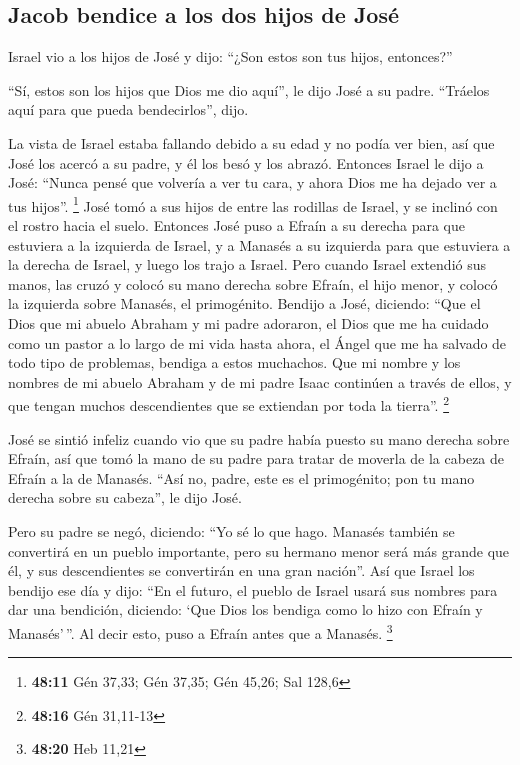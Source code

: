 \hypertarget{jacob-bendice-a-los-dos-hijos-de-josuxe9}{%
\subsection{Jacob bendice a los dos hijos de
José}\label{jacob-bendice-a-los-dos-hijos-de-josuxe9}}

 Israel vio a los hijos de José y dijo: ``¿Son estos son
tus hijos, entonces?''

 ``Sí, estos son los hijos que Dios me dio aquí'', le dijo
José a su padre. ``Tráelos aquí para que pueda bendecirlos'', dijo.

 La vista de Israel estaba fallando debido a su edad y no
podía ver bien, así que José los acercó a su padre, y él los besó y los
abrazó.  Entonces Israel le dijo a José: ``Nunca pensé
que volvería a ver tu cara, y ahora Dios me ha dejado ver a tus hijos''.
\footnote{\textbf{48:11} Gén 37,33; Gén 37,35; Gén 45,26; Sal 128,6}
 José tomó a sus hijos de entre las rodillas de Israel, y
se inclinó con el rostro hacia el suelo.  Entonces José
puso a Efraín a su derecha para que estuviera a la izquierda de Israel,
y a Manasés a su izquierda para que estuviera a la derecha de Israel, y
luego los trajo a Israel.  Pero cuando Israel extendió
sus manos, las cruzó y colocó su mano derecha sobre Efraín, el hijo
menor, y colocó la izquierda sobre Manasés, el primogénito.
 Bendijo a José, diciendo: ``Que el Dios que mi abuelo
Abraham y mi padre adoraron, el Dios que me ha cuidado como un pastor a
lo largo de mi vida hasta ahora,  el Ángel que me ha
salvado de todo tipo de problemas, bendiga a estos muchachos. Que mi
nombre y los nombres de mi abuelo Abraham y de mi padre Isaac continúen
a través de ellos, y que tengan muchos descendientes que se extiendan
por toda la tierra''. \footnote{\textbf{48:16} Gén 31,11-13}

 José se sintió infeliz cuando vio que su padre había
puesto su mano derecha sobre Efraín, así que tomó la mano de su padre
para tratar de moverla de la cabeza de Efraín a la de Manasés.
 ``Así no, padre, este es el primogénito; pon tu mano
derecha sobre su cabeza'', le dijo José.

 Pero su padre se negó, diciendo: ``Yo sé lo que hago.
Manasés también se convertirá en un pueblo importante, pero su hermano
menor será más grande que él, y sus descendientes se convertirán en una
gran nación''.  Así que Israel los bendijo ese día y
dijo: ``En el futuro, el pueblo de Israel usará sus nombres para dar una
bendición, diciendo: `Que Dios los bendiga como lo hizo con Efraín y
Manasés'\,''. Al decir esto, puso a Efraín antes que a Manasés.
\footnote{\textbf{48:20} Heb 11,21}

